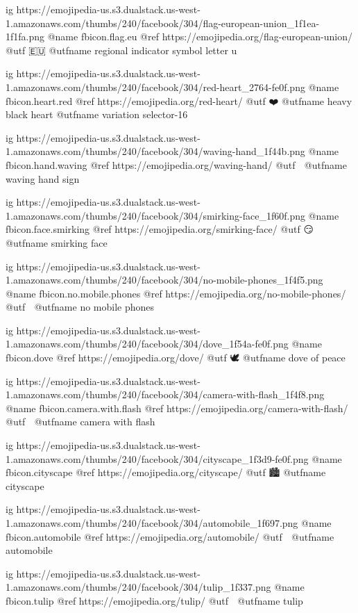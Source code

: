 	ig https://emojipedia-us.s3.dualstack.us-west-1.amazonaws.com/thumbs/240/facebook/304/flag-european-union_1f1ea-1f1fa.png
	@name fbicon.flag.eu
	@ref https://emojipedia.org/flag-european-union/
	@utf 🇪🇺
	@utfname regional indicator symbol letter u

	ig https://emojipedia-us.s3.dualstack.us-west-1.amazonaws.com/thumbs/240/facebook/304/red-heart_2764-fe0f.png
	@name fbicon.heart.red
	@ref https://emojipedia.org/red-heart/
	@utf ❤️
	@utfname heavy black heart 
	@utfname variation selector-16

	ig https://emojipedia-us.s3.dualstack.us-west-1.amazonaws.com/thumbs/240/facebook/304/waving-hand_1f44b.png
	@name fbicon.hand.waving
	@ref https://emojipedia.org/waving-hand/
	@utf 👋
	@utfname waving hand sign

	ig https://emojipedia-us.s3.dualstack.us-west-1.amazonaws.com/thumbs/240/facebook/304/smirking-face_1f60f.png
	@name fbicon.face.smirking
	@ref https://emojipedia.org/smirking-face/
	@utf 😏
	@utfname smirking face

	ig https://emojipedia-us.s3.dualstack.us-west-1.amazonaws.com/thumbs/240/facebook/304/no-mobile-phones_1f4f5.png
	@name fbicon.no.mobile.phones
	@ref https://emojipedia.org/no-mobile-phones/
	@utf 📵
	@utfname no mobile phones

	ig https://emojipedia-us.s3.dualstack.us-west-1.amazonaws.com/thumbs/240/facebook/304/dove_1f54a-fe0f.png
	@name fbicon.dove
	@ref https://emojipedia.org/dove/
	@utf 🕊️
	@utfname dove of peace

	ig https://emojipedia-us.s3.dualstack.us-west-1.amazonaws.com/thumbs/240/facebook/304/camera-with-flash_1f4f8.png
	@name fbicon.camera.with.flash
	@ref https://emojipedia.org/camera-with-flash/
	@utf 📸
	@utfname camera with flash

	ig https://emojipedia-us.s3.dualstack.us-west-1.amazonaws.com/thumbs/240/facebook/304/cityscape_1f3d9-fe0f.png
	@name fbicon.cityscape
	@ref https://emojipedia.org/cityscape/
	@utf 🏙️
	@utfname cityscape

	ig https://emojipedia-us.s3.dualstack.us-west-1.amazonaws.com/thumbs/240/facebook/304/automobile_1f697.png
	@name fbicon.automobile
	@ref https://emojipedia.org/automobile/
	@utf 🚗
	@utfname automobile

	ig https://emojipedia-us.s3.dualstack.us-west-1.amazonaws.com/thumbs/240/facebook/304/tulip_1f337.png
	@name fbicon.tulip
	@ref https://emojipedia.org/tulip/
	@utf 🌷
	@utfname tulip

\fi

